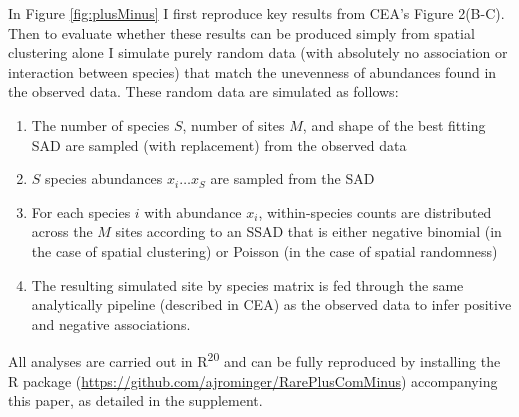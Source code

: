 \documentclass[
]{article}
\providecommand{\tightlist}{%
  \setlength{\itemsep}{0pt}\setlength{\parskip}{0pt}}
\begin{document}
In Figure \ref{fig:plusMinus} I first reproduce key results from CEA's
Figure 2(B-C). Then to evaluate whether these results can be produced
simply from spatial clustering alone I simulate purely random data (with
absolutely no association or interaction between species) that match the
unevenness of abundances found in the observed data. These random data
are simulated as follows:

\begin{enumerate}
\def\labelenumi{\arabic{enumi})}
\tightlist
\item
  The number of species \(S\), number of sites \(M\), and shape of the
  best fitting SAD are sampled (with replacement) from the observed data
\item
  \(S\) species abundances \(x_i \ldots x_S\) are sampled from the SAD
\item
  For each species \(i\) with abundance \(x_i\), within-species counts
  are distributed across the \(M\) sites according to an SSAD that is
  either negative binomial (in the case of spatial clustering) or
  Poisson (in the case of spatial randomness)
\item
  The resulting simulated site by species matrix is fed through the same
  analytically pipeline (described in CEA) as the observed data to infer
  positive and negative associations.
\end{enumerate}

All analyses are carried out in R\textsuperscript{20} and can be fully
reproduced by installing the R package
(\url{https://github.com/ajrominger/RarePlusComMinus}) accompanying this
paper, as detailed in the supplement.
\end{document}
